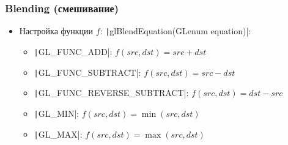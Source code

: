 \documentclass[10pt]{beamer}
\begin{document}
\begin{frame}[fragile]
\frametitle{Blending (смешивание)}
\begin{itemize}
\item Настройка функции \begin{math}f\end{math}: \texttt|glBlendEquation(GLenum equation)|:
\pause
\begin{itemize}
\item \texttt|GL_FUNC_ADD|: \begin{math}f(src, dst) = src + dst\end{math}
\pause
\item \texttt|GL_FUNC_SUBTRACT|: \begin{math}f(src, dst) = src - dst\end{math}
\pause
\item \texttt|GL_FUNC_REVERSE_SUBTRACT|: \begin{math}f(src, dst) = dst - src\end{math}
\pause
\item \texttt|GL_MIN|: \begin{math}f(src, dst) = \min(src, dst)\end{math}
\pause
\item \texttt|GL_MAX|: \begin{math}f(src, dst) = \max(src, dst)\end{math}
\end{itemize}
\end{itemize}
\end{frame}
\end{document}
